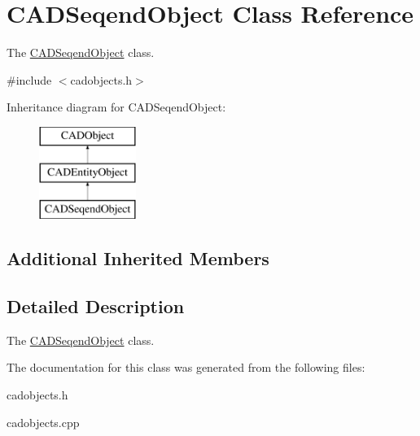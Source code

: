 \hypertarget{class_c_a_d_seqend_object}{}\section{C\+A\+D\+Seqend\+Object Class Reference}
\label{class_c_a_d_seqend_object}


The \hyperlink{class_c_a_d_seqend_object}{C\+A\+D\+Seqend\+Object} class.  




{\ttfamily \#include $<$cadobjects.\+h$>$}

Inheritance diagram for C\+A\+D\+Seqend\+Object\+:\begin{figure}[H]
\begin{center}
\leavevmode
\includegraphics[height=3.000000cm]{class_c_a_d_seqend_object}
\end{center}
\end{figure}
\subsection*{Additional Inherited Members}


\subsection{Detailed Description}
The \hyperlink{class_c_a_d_seqend_object}{C\+A\+D\+Seqend\+Object} class. 

The documentation for this class was generated from the following files\+:\begin{DoxyCompactItemize}
\item 
cadobjects.\+h\item 
cadobjects.\+cpp\end{DoxyCompactItemize}
